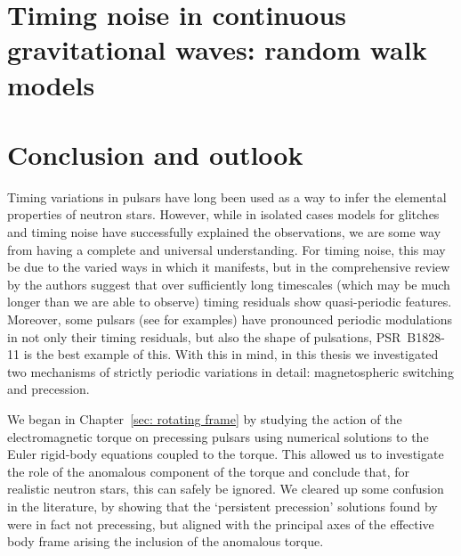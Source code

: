 \documentclass[twoside, 11pt]{thesis}
\begin{document}
\chapter{Timing noise in continuous gravitational waves: random walk models}
\label{sec: timing noise in cgw analytic}


\chapter{Conclusion and outlook}
\label{sec: final conclusion}

Timing variations in pulsars have long been used as a way to infer the
elemental properties of neutron stars. However, while in isolated cases models
for glitches and timing noise have successfully explained the observations, we
are some way from having a complete and universal understanding. For timing
noise, this may be due to the varied ways in which it manifests, but in the
comprehensive review by \citet{Hobbs2010} the authors suggest that over
sufficiently long timescales (which may be much longer than we are able to
observe) timing residuals show quasi-periodic features. Moreover, some pulsars
(see \citet{Lyne2010} for examples) have pronounced periodic modulations in not
only their timing residuals, but also the shape of pulsations, PSR~B1828-11 is
the best example of this.  With this in mind, in this thesis we investigated
two mechanisms of strictly periodic variations in detail: magnetospheric
switching and precession.

We began in Chapter~\ref{sec: rotating frame} by studying the action of the
electromagnetic torque on precessing pulsars using numerical solutions to the
Euler rigid-body equations coupled to the \citet{Deutsch1955} torque. This
allowed us to investigate the role of the anomalous component of the torque and
conclude that, for realistic neutron stars, this can safely be ignored. We
cleared up some confusion in the literature, by showing that the `persistent
precession' solutions found by \citet{Melatos2000} were in fact not
precessing, but aligned with the principal axes of the effective body frame
arising the inclusion of the anomalous torque.
\end{document}
